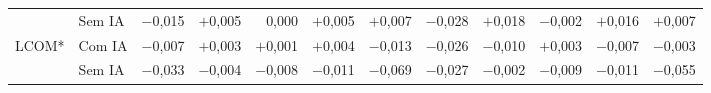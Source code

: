 \begin{table}[htbp]
{\begin{tabular}{ll|rrrrr|rrrrr}
 & Sem IA & $-$0,015 & $+$0,005 & 0,000 & $+$0,005 & $+$0,007 & $-$0,028 & $+$0,018 & $-$0,002 & $+$0,016 & $+$0,007 \\[3pt]
LCOM* & Com IA & $-$0,007 & $+$0,003 & $+$0,001 & $+$0,004 & $-$0,013 & $-$0,026 & $-$0,010 & $+$0,003 & $-$0,007 & $-$0,003 \\
 & Sem IA & $-$0,033 & $-$0,004 & $-$0,008 & $-$0,011 & $-$0,069 & $-$0,027 & $-$0,002 & $-$0,009 & $-$0,011 & $-$0,055 \\
\hline
\end{tabular}}
\par\vspace{2pt}{\footnotesize Nota: * comparações calculadas apenas nos repositórios medidos em E1 (9 com IA e 11 sem IA), criados até 2013.}
\end{table}

